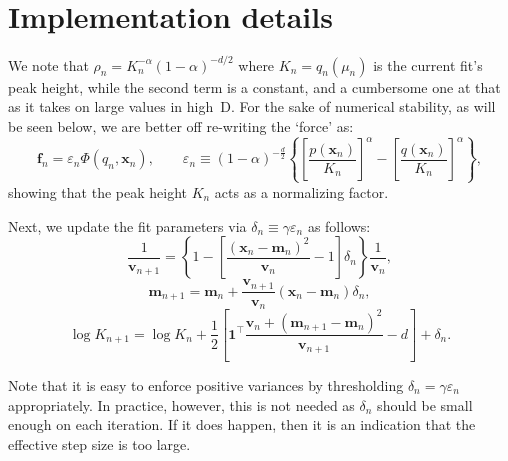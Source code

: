 \documentclass{article}
\def\x{\mathbf{x}}
\def\m{\mathbf{m}}
\def\v{\mathbf{v}}
\def\f{\mathbf{f}}
\begin{document}



\section{Implementation details}

We note that $\rho_n=K_n^{-\alpha}(1-\alpha)^{-d/2}$ where $K_n=q_n(\mu_n)$ is the current fit's peak height, while the second term is a constant, and a cumbersome one at that as it takes on large values in high~D. For the sake of numerical stability, as will be seen below, we are better off re-writing the `force' as: 
$$
\f_n = \varepsilon_n \Phi(q_n,\x_n),
\qquad
\varepsilon_n \equiv
(1-\alpha)^{-\frac{d}{2}}\left\{
\left[\frac{p(\x_n)}{K_n}\right]^\alpha
-\left[\frac{q(\x_n)}{K_n}\right]^\alpha
\right\},
$$
showing that the peak height $K_n$ acts as a normalizing factor. 




Next, we update the fit parameters via $\delta_n\equiv\gamma\varepsilon_n$ as follows:
$$
\frac{1}{\v_{n+1}} = \left\{
1 - \left[\frac{(\x_n-\m_n)^2}{\v_n} - 1\right] \delta_n
\right\} \frac{1}{\v_{n}},
$$
$$
\m_{n+1} = \m_{n} + \frac{\v_{n+1}}{\v_n}
(\x_n-\m_n)\delta_n,
$$
$$
\log K_{n+1} = \log K_n + \frac{1}{2}\left[\mathbf{1}^\top
\frac{\v_n + (\m_{n+1}-\m_n)^2}{\v_{n+1}} - d
\right]
+ \delta_n.
$$

Note that it is easy to enforce positive variances by thresholding $\delta_n=\gamma\varepsilon_n$ appropriately. In practice, however, this is not needed as $\delta_n$ should be small enough on each iteration. If it does happen, then it is an indication that the effective step size is too large.
\end{document}
